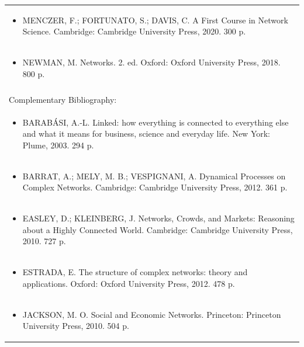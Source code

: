 \documentclass[11pt]{article}
\begin{document}
\begin{center}
\begin{longtable}{|p{4cm}|p{4cm}|p{4cm}|p{4cm}|}
\multicolumn{4}{|p{\dimexpr 16cm + 6\tabcolsep\relax}|}{\begin{itemize}\item MENCZER, F.; FORTUNATO, S.; DAVIS, C. A First Course in Network Science. Cambridge: Cambridge University Press, 2020. 300 p.\end{itemize}}\\
\multicolumn{4}{|p{\dimexpr 16cm + 6\tabcolsep\relax}|}{\begin{itemize}\item NEWMAN, M. Networks. 2. ed. Oxford: Oxford University Press, 2018. 800 p.\end{itemize}}\\
\multicolumn{4}{|p{16cm}|}{}\\
\hline
\multicolumn{4}{|p{16cm}|}{Complementary Bibliography:}\\*
\multicolumn{4}{|p{\dimexpr 16cm + 6\tabcolsep\relax}|}{\begin{itemize}\item BARABÁSI, A.-L. Linked: how everything is connected to everything else and what it means for business, science and everyday life. New York: Plume, 2003. 294 p.\end{itemize}}\\
\multicolumn{4}{|p{\dimexpr 16cm + 6\tabcolsep\relax}|}{\begin{itemize}\item BARRAT, A.; MELY, M. B.; VESPIGNANI, A. Dynamical Processes on Complex Networks. Cambridge: Cambridge University Press, 2012. 361 p.\end{itemize}}\\
\multicolumn{4}{|p{\dimexpr 16cm + 6\tabcolsep\relax}|}{\begin{itemize}\item EASLEY, D.; KLEINBERG, J. Networks, Crowds, and Markets: Reasoning about a Highly Connected World. Cambridge: Cambridge University Press, 2010. 727 p.\end{itemize}}\\
\multicolumn{4}{|p{\dimexpr 16cm + 6\tabcolsep\relax}|}{\begin{itemize}\item ESTRADA, E. The structure of complex networks: theory and applications. Oxford: Oxford University Press, 2012. 478 p.\end{itemize}}\\
\multicolumn{4}{|p{\dimexpr 16cm + 6\tabcolsep\relax}|}{\begin{itemize}\item JACKSON, M. O. Social and Economic Networks. Princeton: Princeton University Press, 2010. 504 p.\end{itemize}}\\
\hline
\end{longtable}
\end{center}
\end{document}
